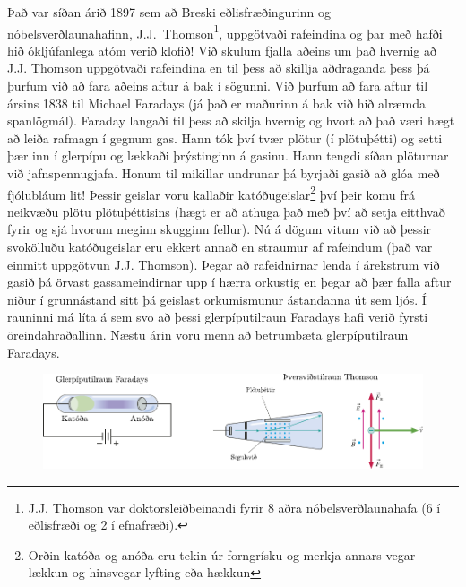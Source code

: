 \ifdefined \wholebook \else\documentclass[oneside]{book}\usepackage{EdlBook}\graphicspath{{figures/}}
\begin{document}
Það var síðan árið 1897 sem að Breski eðlisfræðingurinn og nóbelsverðlaunahafinn, J.J.~Thomson\footnote{J.J. Thomson var doktorsleiðbeinandi fyrir 8 aðra nóbelsverðlaunahafa (6 í eðlisfræði og 2 í efnafræði).}, uppgötvaði rafeindina og þar með hafði hið ókljúfanlega atóm verið klofið!  Við skulum fjalla aðeins um það hvernig að J.J. Thomson uppgötvaði rafeindina en til þess að skillja aðdraganda þess þá þurfum við að fara aðeins aftur á bak í sögunni. Við þurfum að fara aftur til ársins 1838 til Michael Faradays (já það er maðurinn á bak við hið alræmda spanlögmál). Faraday langaði til þess að skilja hvernig og hvort að það væri hægt að leiða rafmagn í gegnum gas. Hann tók því tvær plötur (í plötuþétti) og setti þær inn í glerpípu og lækkaði þrýstinginn á gasinu. Hann tengdi síðan plöturnar við jafnspennugjafa. Honum til mikillar undrunar þá byrjaði gasið að glóa með fjólubláum lit! Þessir geislar voru kallaðir katóðugeislar\footnote{Orðin katóða og anóða eru tekin úr forngrísku og merkja annars vegar lækkun og hinsvegar lyfting eða hækkun} því þeir komu frá neikvæðu plötu plötuþéttisins (hægt er að athuga það með því að setja eitthvað fyrir og sjá hvorum meginn skugginn fellur). Nú á dögum vitum við að þessir svokölluðu katóðugeislar eru ekkert annað en straumur af rafeindum (það var einmitt uppgötvun J.J. Thomson). Þegar að rafeidnirnar lenda í árekstrum við gasið þá örvast gassameindirnar upp í hærra orkustig en þegar að þær falla aftur niður í grunnástand sitt þá geislast orkumismunur ástandanna út sem ljós. Í rauninni má líta á sem svo að þessi glerpíputilraun Faradays hafi verið fyrsti öreindahraðallinn. Næstu árin voru menn að betrumbæta glerpíputilraun Faradays.

\begin{figure}[H]
    \centering
    \includegraphics[]{figures/jjthomson.pdf}
\end{figure}
\end{document}
